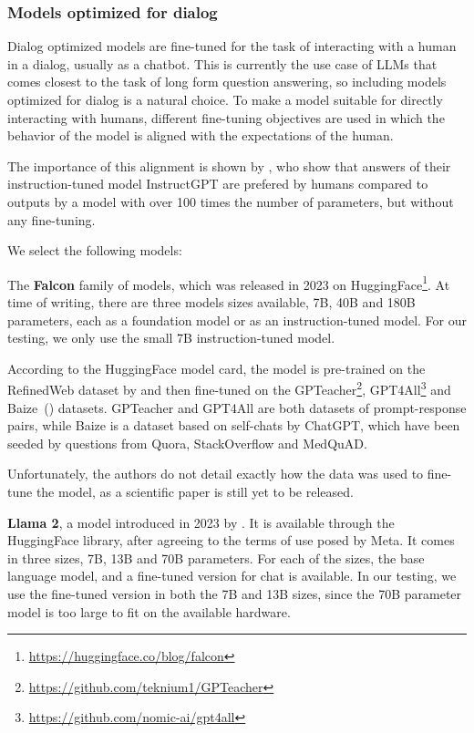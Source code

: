 \subsubsection{Models optimized for dialog}\label{sec:dialog-models}
Dialog optimized models are fine-tuned for the task of interacting with a human in a dialog, usually as a chatbot.
This is currently the use case of LLMs that comes closest to the task of long form question answering, so including models optimized for dialog is a natural choice.
To make a model suitable for directly interacting with humans, different fine-tuning objectives are used in which the behavior of the model is aligned with the expectations of the human.

The importance of this alignment is shown by \cite{ouyang:2022:Training}, who show that answers of their instruction-tuned model InstructGPT are prefered by humans compared to outputs by a model with over 100 times the number of parameters, but without any fine-tuning.

We select the following models:

The \textbf{Falcon} family of models, which was released in 2023 on HuggingFace\footnote{\url{https://huggingface.co/blog/falcon}}.
At time of writing, there are three models sizes available, 7B, 40B and 180B parameters, each as a foundation model or as an instruction-tuned model.
For our testing, we only use the small 7B instruction-tuned model.

According to the HuggingFace model card, the model is pre-trained on the RefinedWeb dataset by \cite{penedo:2023:The} and then fine-tuned on the GPTeacher\footnote{\url{https://github.com/teknium1/GPTeacher}}, GPT4All\footnote{\url{https://github.com/nomic-ai/gpt4all}} and Baize~(\cite{xu:2023:Baize}) datasets.
GPTeacher and GPT4All are both datasets of prompt-response pairs, while Baize is a dataset based on self-chats by ChatGPT, which have been seeded by questions from Quora, StackOverflow and MedQuAD.

Unfortunately, the authors do not detail exactly how the data was used to fine-tune the model, as a scientific paper is still yet to be released.


\textbf{Llama 2}, a model introduced in 2023 by \cite{touvron:2023:Llama}.
It is available through the HuggingFace library, after agreeing to the terms of use posed by Meta.
It comes in three sizes, 7B, 13B and 70B parameters.
For each of the sizes, the base language model, and a fine-tuned version for chat is available.
In our testing, we use the fine-tuned version in both the 7B and 13B sizes, since the 70B parameter model is too large to fit on the available hardware.

